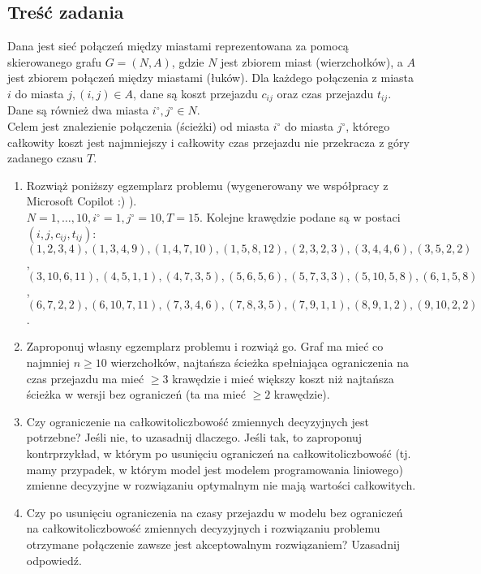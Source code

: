 \documentclass{article}
\begin{document}
\subsection{Treść zadania}
Dana jest sieć połączeń między miastami reprezentowana za pomocą skierowanego grafu $G = (N, A)$, gdzie $N$ jest zbiorem miast (wierzchołków), a $A$ jest zbiorem połączeń między miastami (łuków). Dla każdego połączenia z miasta $i$ do miasta $j, (i, j) \in A$, dane są koszt przejazdu $c_{ij}$ oraz czas przejazdu $t_{ij}$. Dane są również dwa miasta $i^\circ, j^\circ \in N$.\\
Celem jest znalezienie połączenia (ścieżki) od miasta $i^\circ$ do miasta $j^\circ$, którego całkowity koszt jest najmniejszy i całkowity czas przejazdu nie przekracza z góry zadanego czasu $T$.\\
\begin{enumerate}[label=(\alph*)]
    \item Rozwiąż poniższy egzemplarz problemu (wygenerowany we współpracy z Microsoft Copilot :) ).\\
$N = {1, \dots, 10}, i^\circ = 1, j^\circ = 10, T = 15$. Kolejne krawędzie podane są w postaci $(i, j, c_{ij}, t_{ij})$:\\
$(1, 2, 3, 4), (1, 3, 4, 9), (1, 4, 7, 10), (1, 5, 8, 12), (2, 3, 2, 3), (3, 4, 4, 6), (3, 5, 2, 2)$,\\
$(3, 10, 6, 11), (4, 5, 1, 1), (4, 7, 3, 5), (5, 6, 5, 6), (5, 7, 3, 3), (5, 10, 5, 8), (6, 1, 5, 8)$,\\ 
$(6, 7, 2, 2), (6, 10, 7, 11), (7, 3, 4, 6), (7, 8, 3, 5), (7, 9, 1, 1), (8, 9, 1, 2), (9, 10, 2, 2)$.
\item Zaproponuj własny egzemplarz problemu i rozwiąż go. Graf ma mieć co najmniej $n \geq 10$ wierzchołków, najtańsza ścieżka spełniająca ograniczenia na czas przejazdu ma mieć $ \geq 3$ krawędzie i mieć większy koszt niż najtańsza ścieżka w wersji bez ograniczeń (ta ma mieć $ \geq 2$ krawędzie).
\item Czy ograniczenie na całkowitoliczbowość zmiennych decyzyjnych jest potrzebne? Jeśli nie, to uzasadnij dlaczego. Jeśli tak, to zaproponuj kontrprzykład, w którym po usunięciu ograniczeń na całkowitoliczbowość (tj. mamy przypadek, w którym model jest modelem programowania liniowego) zmienne decyzyjne w rozwiązaniu optymalnym nie mają wartości całkowitych.
\item Czy po usunięciu ograniczenia na czasy przejazdu w modelu bez ograniczeń na całkowitoliczbowość zmiennych decyzyjnych i rozwiązaniu problemu otrzymane połączenie zawsze jest akceptowalnym rozwiązaniem? Uzasadnij odpowiedź.
\end{enumerate}
\end{document}
